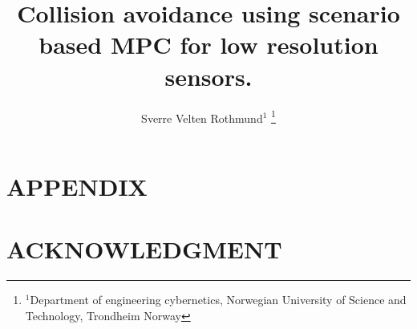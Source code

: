\documentclass[letterpaper, 10 pt, conference]{ieeeconf}  %
\title{\LARGE \bf
Collision avoidance using scenario based MPC for low resolution sensors. 
}
\author{Sverre Velten Rothmund$^{1}$ %
\thanks{$^{1}$Department of engineering cybernetics, Norwegian University of Science and Technology, Trondheim Norway}%
}
\begin{document}
\maketitle
\thispagestyle{empty}
\pagestyle{empty}
















\section*{APPENDIX}

\section*{ACKNOWLEDGMENT}
\end{document}
